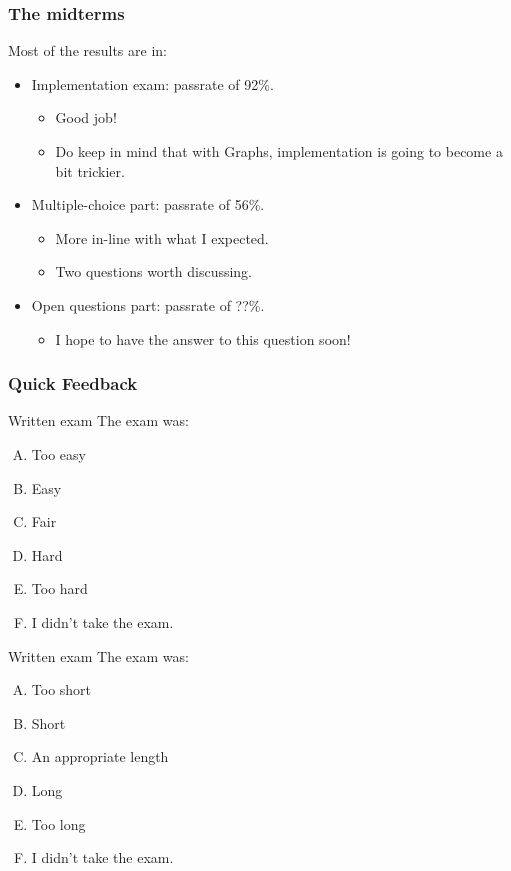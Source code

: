 

\begin{frame}
	\frametitle{The midterms}
	Most of the results are in:
	\begin{itemize}
		\item Implementation exam: passrate of 92\%.
			\begin{itemize}
				\item Good job!
				\item Do keep in mind that with Graphs, implementation is going to become a bit trickier.
			\end{itemize}
		\item Multiple-choice part: passrate of 56\%.
			\begin{itemize}
				\item More in-line with what I expected.
				\item Two questions worth discussing.
			\end{itemize}
		\item Open questions part: passrate of ??\%.
			\begin{itemize}
				\item I hope to have the answer to this question soon!
			\end{itemize}
	\end{itemize}
\end{frame}

\begin{frame}
	\frametitle{Quick Feedback}
\begin{questionblock}{Written exam}
	The exam was: 
	\begin{multicols}{2}
	\begin{enumerate}[A.]
		\item Too easy
		\item Easy
		\item Fair
		\item Hard
		\item Too hard
		\item I didn't take the exam.
	\end{enumerate}
\end{multicols}
\end{questionblock}	

\begin{questionblock}{Written exam}
	The exam was: 
	\begin{multicols}{2}
	\begin{enumerate}[A.]
		\item Too short
		\item Short
		\item An appropriate length
		\item Long
		\item Too long
		\item I didn't take the exam.
	\end{enumerate}
\end{multicols}
\end{questionblock}	
\end{frame}

